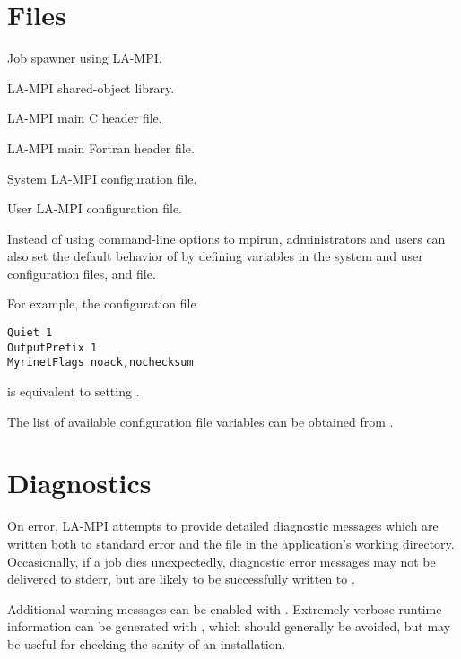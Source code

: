 \documentclass[english]{article}
\begin{document}
\section{Files}
\begin{Description}\setlength{\itemsep}{0cm}
\item[\File{mpirun}] Job spawner using LA-MPI.
\item[\File{libmpi.so}] LA-MPI shared-object library.
\item[\File{mpi.h}] LA-MPI main C header file.
\item[\File{mpif.h}] LA-MPI main Fortran header file.
\item[\File{\$MPI\_ROOT/lampi.conf}] System LA-MPI configuration file.
\item[\File{\$HOME/.lampi.conf}] User LA-MPI configuration file.

Instead of using command-line options to mpirun, administrators and
users can also set the default behavior of  by defining
variables in the system and user configuration files,
 and 
file.

For example, the configuration file

\begin{verbatim}
Quiet 1
OutputPrefix 1
MyrinetFlags noack,nochecksum
\end{verbatim}

is equivalent to setting .

The list of available configuration file variables can be
obtained from .

\end{Description}

\section{Diagnostics}

On error, LA-MPI attempts to provide detailed diagnostic messages
which are written both to standard error and the file 
in the application's working directory.  Occasionally, if a job dies
unexpectedly, diagnostic error messages may not be delivered to
stderr, but are likely to be successfully written to .

Additional warning messages can be enabled with .
Extremely verbose runtime information can be generated with
, which should generally be avoided, but may be
useful for checking the sanity of an installation.
\end{document}
